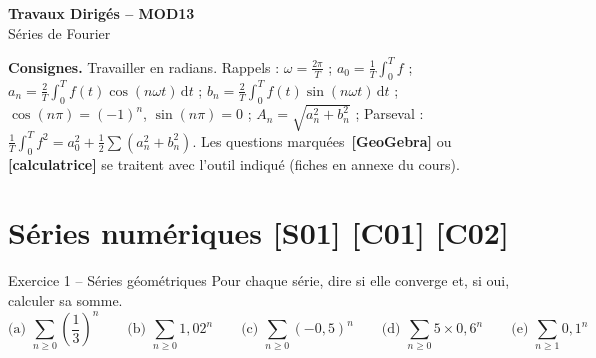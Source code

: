 \documentclass[a4paper,11pt]{article}
\newcommand{\calc}{\,{\color{uimmred}\small\textbf{[calculatrice]}}}
\newcommand{\geo}{\,{\color{uimmred}\small\textbf{[GeoGebra]}}}
\begin{document}
\begin{tcolorbox}[colback=uimmblue, colframe=uimmblue, sharp corners, boxrule=0pt,
  left=14pt, right=14pt, top=10pt, bottom=10pt]
{\color{white}\LARGE\bfseries Travaux Dirigés -- MOD13}\\[4pt]
{\color{white}\large Séries de Fourier}
\end{tcolorbox}

\vspace{2pt}

\begin{consigne}
\textbf{Consignes.} Travailler en radians. Rappels : $\omega = \frac{2\pi}{T}$ ; $a_0 = \frac1T\int_0^T f$ ; $a_n = \frac2T\int_0^T f(t)\cos(n\omega t)\,\mathrm dt$ ; $b_n = \frac2T\int_0^T f(t)\sin(n\omega t)\,\mathrm dt$ ; $\cos(n\pi) = (-1)^n$, $\sin(n\pi) = 0$ ; $A_n = \sqrt{a_n^2+b_n^2}$ ; Parseval : $\frac1T\int_0^T f^2 = a_0^2 + \frac12\sum(a_n^2+b_n^2)$. Les questions marquées \geo{} ou \calc{} se traitent avec l'outil indiqué (fiches en annexe du cours).
\end{consigne}

\needspace{7cm}
\section{Séries numériques \hfill {\normalsize\color{uimmred}[S01] [C01] [C02]}}

\begin{exo}{Exercice 1 -- Séries géométriques}
\label{exo:1}
Pour chaque série, dire si elle converge et, si oui, calculer sa somme.
\[
\text{(a) } \sum_{n\geq 0}\left(\frac13\right)^n
\qquad
\text{(b) } \sum_{n\geq 0} 1{,}02^n
\qquad
\text{(c) } \sum_{n\geq 0}(-0{,}5)^n
\qquad
\text{(d) } \sum_{n\geq 0} 5\times 0{,}6^n
\qquad
\text{(e) } \sum_{n\geq 1} 0{,}1^n
\]
\end{exo}
\end{document}
